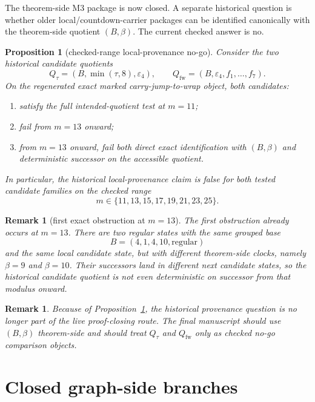 \documentclass[11pt]{article}
\newtheorem{proposition}[theorem]{Proposition}
\newtheorem{remark}[theorem]{Remark}
\newcommand{\eps}{\varepsilon}
\begin{document}
The theorem-side M3 package is now closed. A separate historical question is
whether older local/countdown-carrier packages can be identified canonically
with the theorem-side quotient $(B,\beta)$. The current checked answer is no.

\begin{proposition}[checked-range local-provenance no-go]
\label{prop:provenance-no-go}
Consider the two historical candidate quotients
\[
Q_{\tau}=(B,\min(\tau,8),\eps_4),
\qquad
Q_{\mathrm{fw}}=(B,\eps_4,f_1,\dots,f_7).
\]
On the regenerated exact marked carry-jump-to-wrap object, both candidates:
\begin{enumerate}[label=\textup{(\alph*)},leftmargin=2.5em]
\item satisfy the full intended-quotient test at $m=11$;
\item fail from $m=13$ onward;
\item from $m=13$ onward, fail both direct exact identification with
      $(B,\beta)$ and deterministic successor on the accessible quotient.
\end{enumerate}
In particular, the historical local-provenance claim is false for both tested
candidate families on the checked range
\[
m\in\{11,13,15,17,19,21,23,25\}.
\]
\end{proposition}

\begin{remark}[first exact obstruction at $m=13$]
The first obstruction already occurs at $m=13$.
There are two regular states with the same grouped base
\[
B=(4,1,4,10,\mathrm{regular})
\]
and the same local candidate state, but with different theorem-side clocks,
namely $\beta=9$ and $\beta=10$.
Their successors land in different next candidate states, so the historical
candidate quotient is not even deterministic on successor from that modulus
onward.
\end{remark}

\begin{remark}
Because of Proposition~\ref{prop:provenance-no-go}, the historical provenance
question is no longer part of the live proof-closing route. The final manuscript
should use $(B,\beta)$ theorem-side and should treat $Q_{\tau}$ and
$Q_{\mathrm{fw}}$ only as checked no-go comparison objects.
\end{remark}

\section{Closed graph-side branches}
\end{document}
